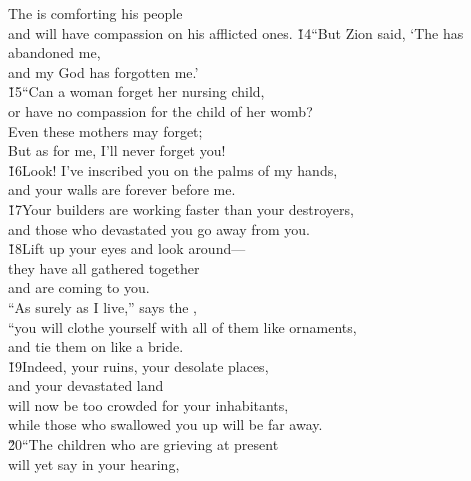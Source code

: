 \begin{poetry}
\poeml The  is comforting his people \\
\poemll    and will have compassion on his afflicted ones.
\poeml \v{14}``But Zion said, `The  has abandoned me, \\
\poemll    and my God has forgotten me.' \\
\poeml \v{15}``Can a woman forget her nursing child, \\
\poemll    or have no compassion for the child of her womb? \\
\poeml Even these mothers may forget; \\
\poemll    But as for me, I'll never forget you! \\
\poeml \v{16}Look! I've inscribed you on the palms of my hands, \\
\poemll    and your walls are forever before me. \\
\poeml \v{17}Your builders are working faster than your destroyers, \\
\poemll    and those who devastated you go away from you. \\
\poeml \v{18}Lift up your eyes and look around--- \\
\poemll    they have all gathered together \\
\poemlll       and are coming to you. \\
\poeml ``As surely as I live,'' says the , \\
\poemll    ``you will clothe yourself with all of them like ornaments, \\
\poemlll       and tie them on like a bride. \\
\poeml \v{19}Indeed, your ruins, your desolate places, \\
\poemll    and your devastated land \\
\poeml will now be too crowded for your inhabitants, \\
\poemll    while those who swallowed you up will be far away. \\
\poeml \v{20}``The children who are grieving at present \\
\poemll    will yet say in your hearing, \\

\end{poetry}
